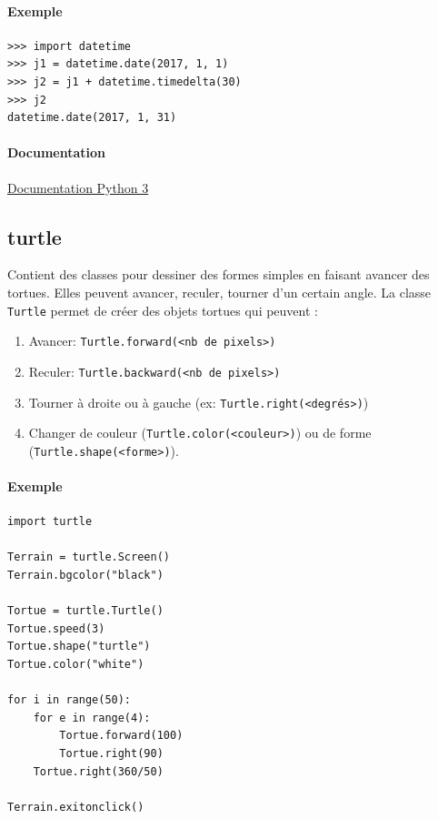 \documentclass[a4paper, 10pt]{article}
\newcommand{\code}[1]{{\small\texttt{#1}}}
\begin{document}
\paragraph{Exemple}
\begin{Verbatim}[fontsize = \footnotesize, frame = single]
>>> import datetime
>>> j1 = datetime.date(2017, 1, 1)
>>> j2 = j1 + datetime.timedelta(30)
>>> j2
datetime.date(2017, 1, 31)
\end{Verbatim}


\paragraph*{Documentation} \href{https://docs.python.org/fr/3/library/datetime.html}{Documentation Python 3}

\subsection{turtle}

Contient des classes pour dessiner des formes simples en faisant avancer des tortues. Elles peuvent avancer, reculer, tourner d'un certain angle.
La classe \code{Turtle} permet de créer des objets tortues qui peuvent :
\begin{enumerate}
        \item Avancer: \code{Turtle.forward(<nb de pixels>)}
        \item Reculer: \code{Turtle.backward(<nb de pixels>)}
        \item Tourner à droite ou à gauche (ex: \code{Turtle.right(<degrés>)})
        \item Changer de couleur (\code{Turtle.color(<couleur>)}) ou de forme (\code{Turtle.shape(<forme>)}).
\end{enumerate}

\paragraph{Exemple}
\begin{verbatim}
import turtle

Terrain = turtle.Screen()
Terrain.bgcolor("black")

Tortue = turtle.Turtle()
Tortue.speed(3)
Tortue.shape("turtle")
Tortue.color("white")

for i in range(50):
    for e in range(4):
        Tortue.forward(100)
        Tortue.right(90)
    Tortue.right(360/50)

Terrain.exitonclick()
\end{verbatim}
\end{document}
